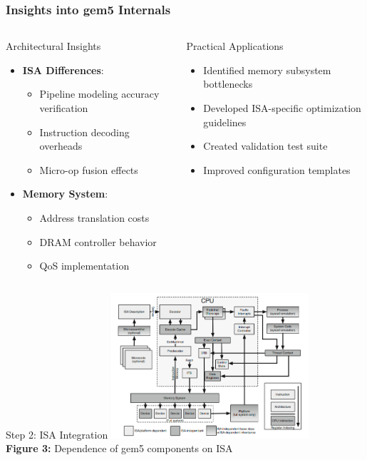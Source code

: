   \begin{frame}[fragile]
  \frametitle{Insights into gem5 Internals}
  
  \begin{columns}
  \begin{column}{0.45\textwidth}
  \begin{alertblock}{Architectural Insights}
  \begin{itemize}
      \item \textbf{ISA Differences}:
      \begin{itemize}
          \item Pipeline modeling accuracy verification
          \item Instruction decoding overheads
          \item Micro-op fusion effects
      \end{itemize}
      
      \item \textbf{Memory System}:
      \begin{itemize}
          \item Address translation costs
          \item DRAM controller behavior
          \item QoS implementation
      \end{itemize}
  \end{itemize}
  \end{alertblock}
  \end{column}
  
  \begin{column}{0.45\textwidth}
  \begin{block}{Practical Applications}
  \begin{itemize}
      \item Identified memory subsystem bottlenecks
      \item Developed ISA-specific optimization guidelines
      \item Created validation test suite
      \item Improved configuration templates
  \end{itemize}
  \end{block}
  \end{column}
  \end{columns}
  \end{frame}

\begin{frame}{Step 2: ISA Integration}
	\centering
	\includegraphics[width=0.55\textwidth]{images/impl.png}\\
	\textbf{Figure 3: }Dependence of gem5 components on ISA
\end{frame}

